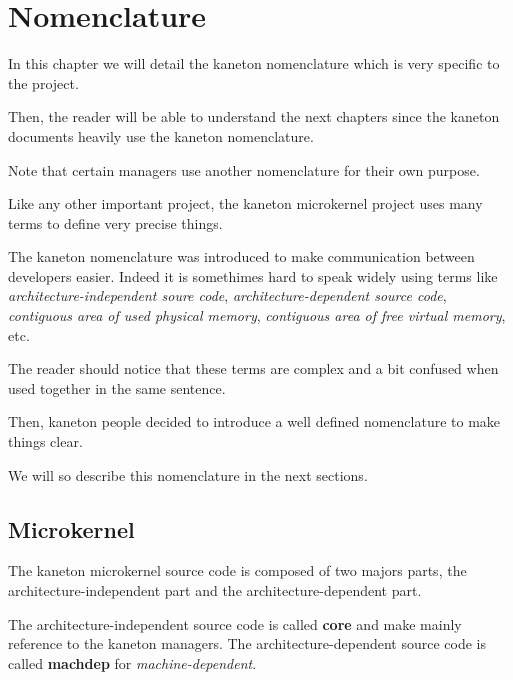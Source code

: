 
%
%

\chapter{Nomenclature}

In this chapter we will detail the kaneton nomenclature which is very
specific to the project.

Then, the reader will be able to understand the next chapters since the
kaneton documents heavily use the kaneton nomenclature.

Note that certain managers use another nomenclature for their own
purpose.

\newpage

%
%

Like any other important project, the kaneton microkernel project
uses many terms to define very precise things.

The kaneton nomenclature was introduced to make communication between
developers easier. Indeed it is somethimes hard to speak widely using
terms like \textit{architecture-independent soure code},
\textit{architecture-dependent source code},
\textit{contiguous area of used physical memory},
\textit{contiguous area of free virtual memory}, etc.

The reader should notice that these terms are complex and a bit confused
when used together in the same sentence.

Then, kaneton people decided to introduce a well defined nomenclature
to make things clear.

We will so describe this nomenclature in the next sections.

%
%

\section{Microkernel}

The kaneton microkernel source code is composed of two majors parts, the
architecture-independent part and the architecture-dependent part.

The architecture-independent source code is called \textbf{core} and
make mainly reference to the kaneton managers. The architecture-dependent
source code is called \textbf{machdep} for \textit{machine-dependent}.

